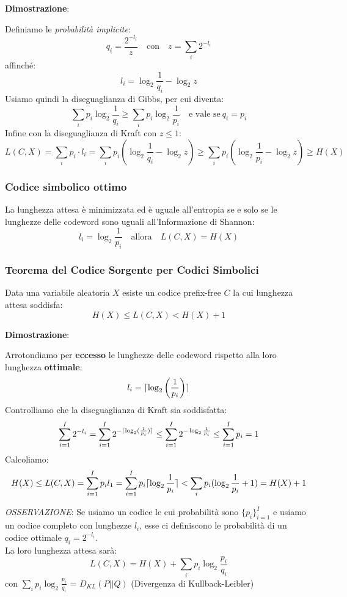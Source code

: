 \textbf{Dimostrazione}:

Definiamo le \textit{probabilità implicite}: 
$$
q_i = \frac{2^{-l_i}}{z}\quad \text{con} \quad z=\sum_{i} 2^{-l_i}
$$
affinché: 
$$
l_i = \log_{2}\frac{1}{q_i}  - \log_{2} z
$$
Usiamo quindi la diseguaglianza di Gibbs, per cui diventa:
$$
\sum_{i} p_i \log_{2} \frac{1}{q_i} \geq \sum_{i} p_i \log_2 \frac{1}{p_i}\quad \text{e vale se}\ q_i = p_i
$$
Infine con la diseguaglianza di Kraft con $z \leq 1$:
$$
L(C,X) = \sum_{i} p_i\cdot l_i = \sum_{i} p_i (\log_{2}\frac{1}{q_i} - \log_2 z) \geq \sum_{i} p_i (\log_{2}\frac{1}{p_i} - \log_2 z) \geq H(X)
$$

\subsubsection{Codice simbolico ottimo}
La lunghezza attesa è minimizzata ed è uguale all'entropia se e solo se le lunghezze delle codeword sono uguali all'Informazione di Shannon:
$$
l_i = \log_{2}\frac{1}{p_i}\quad \text{allora}\quad L(C,X)= H(X)
$$

\newpage
\subsubsection{Teorema del Codice Sorgente per Codici Simbolici}
Data una variabile aleatoria $X$ esiste un codice prefix-free $C$ la cui lunghezza attesa soddisfa:
\begin{equation}
	H(X) \leq L(C,X) < H(X) + 1
\end{equation}

\textbf{Dimostrazione}:

Arrotondiamo per \textbf{eccesso} le lunghezze delle codeword rispetto alla loro lunghezza \textbf{ottimale}: $$l_i = \lceil\log_{2}\left(\frac{1}{p_i}\right)\rceil$$
Controlliamo che la diseguaglianza di Kraft sia soddisfatta:
$$
\sum_{i=1}^{I} 2^{-l_i} = \sum_{i=1}^{I} 2^{-\lceil\log_{2}(\frac{1}{p_i})\rceil} \leq \sum_{i=1}^{I} 2^{-\log_{2}\frac{1}{p_i}} \leq \sum_{i=1}^{I} p_i = 1
$$
Calcoliamo:
$$
H(X) \leq L(C,X) = \sum_{i=1}^{I} p_i l_1 = \sum_{i=1}^{I} p_i \lceil\log_{2}\frac{1}{p_i}\rceil < \sum_{i} p_i (\log_{2} \frac{1}{p_i} + 1) = H(X) + 1
$$

\textit{OSSERVAZIONE}: Se usiamo un codice le cui probabilità sono $\{p_i\}_{i=1}^I$ e usiamo un codice completo con lunghezze $l_i$, esse ci definiscono le probabilità di un codice ottimale $q_i = 2^{-l_i}$.\\
La loro lunghezza attesa sarà:
$$
L(C,X) = H(X) + \sum_{i} p_i \log_{2}\frac{p_i}{q_i}
$$
con $\sum_{i} p_i \log_{2}\frac{p_i}{q_i}$ = $D_{KL}(P||Q)$ (Divergenza di Kullback-Leibler)

